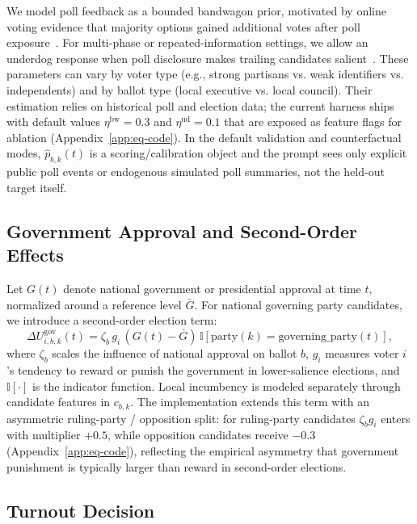 \documentclass[11pt]{article}
\begin{document}
We model poll feedback as a bounded bandwagon prior, motivated by online voting evidence that majority options gained additional votes after poll exposure~\cite{farjam2021bandwagon}. For multi-phase or repeated-information settings, we allow an underdog response when poll disclosure makes trailing candidates salient~\cite{morton2020underdog}. These parameters can vary by voter type (e.g., strong partisans vs. weak identifiers vs. independents) and by ballot type (local executive vs. local council). Their estimation relies on historical poll and election data; the current harness ships with default values $\eta^{\text{bw}} = 0.3$ and $\eta^{\text{ud}} = 0.1$ that are exposed as feature flags for ablation (Appendix~\ref{app:eq-code}). In the default validation and counterfactual modes, $\hat p_{b,k}(t)$ is a scoring/calibration object and the prompt sees only explicit public poll events or endogenous simulated poll summaries, not the held-out target itself.

\subsection{Government Approval and Second-Order Effects}

Let $G(t)$ denote national government or presidential approval at time $t$, normalized around a reference level $\bar{G}$. For national governing party candidates, we introduce a second-order election term:
\begin{equation}
\Delta U^{\text{gov}}_{i,b,k}(t) = \zeta_b \, g_i \, (G(t) - \bar{G}) \, \mathbb{I}[\text{party}(k) = \text{governing\_party}(t)],
\end{equation}
where $\zeta_b$ scales the influence of national approval on ballot $b$, $g_i$ measures voter $i$'s tendency to reward or punish the government in lower-salience elections, and $\mathbb{I}[\cdot]$ is the indicator function. Local incumbency is modeled separately through candidate features in $c_{b,k}$. The implementation extends this term with an asymmetric ruling-party / opposition split: for ruling-party candidates $\zeta_b g_i$ enters with multiplier $+0.5$, while opposition candidates receive $-0.3$ (Appendix~\ref{app:eq-code}), reflecting the empirical asymmetry that government punishment is typically larger than reward in second-order elections.

\subsection{Turnout Decision}
\end{document}
